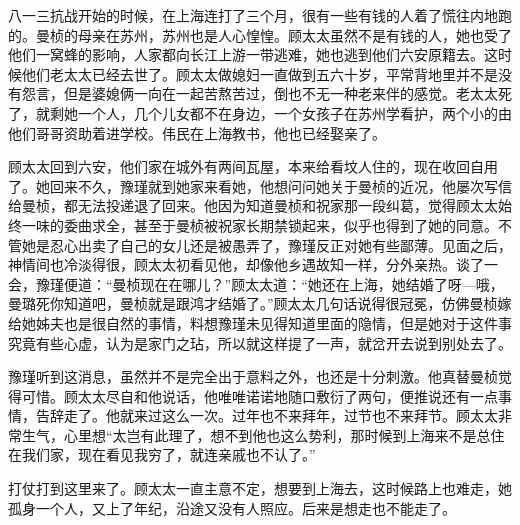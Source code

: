 \par 八一三抗战开始的时候，在上海连打了三个月，很有一些有钱的人着了慌往内地跑的。曼桢的母亲在苏州，苏州也是人心惶惶。顾太太虽然不是有钱的人，她也受了他们一窝蜂的影响，人家都向长江上游一带逃难，她也逃到他们六安原籍去。这时候他们老太太已经去世了。顾太太做媳妇一直做到五六十岁，平常背地里并不是没有怨言，但是婆媳俩一向在一起苦熬苦过，倒也不无一种老来伴的感觉。老太太死了，就剩她一个人，几个儿女都不在身边，一个女孩子在苏州学看护，两个小的由他们哥哥资助着进学校。伟民在上海教书，他也已经娶亲了。
\par 顾太太回到六安，他们家在城外有两间瓦屋，本来给看坟人住的，现在收回自用了。她回来不久，豫瑾就到她家来看她，他想问问她关于曼桢的近况，他屡次写信给曼桢，都无法投递退了回来。他因为知道曼桢和祝家那一段纠葛，觉得顾太太始终一味的委曲求全，甚至于曼桢被祝家长期禁锁起来，似乎也得到了她的同意。不管她是忍心出卖了自己的女儿还是被愚弄了，豫瑾反正对她有些鄙薄。见面之后，神情间也冷淡得很，顾太太初看见他，却像他乡遇故知一样，分外亲热。谈了一会，豫瑾便道：“曼桢现在在哪儿？”顾太太道：“她还在上海，她结婚了呀—哦，曼璐死你知道吧，曼桢就是跟鸿才结婚了。”顾太太几句话说得很冠冕，仿佛曼桢嫁给她姊夫也是很自然的事情，料想豫瑾未见得知道里面的隐情，但是她对于这件事究竟有些心虚，认为是家门之玷，所以就这样提了一声，就岔开去说到别处去了。
\par 豫瑾听到这消息，虽然并不是完全出于意料之外，也还是十分刺激。他真替曼桢觉得可惜。顾太太尽自和他说话，他唯唯诺诺地随口敷衍了两句，便推说还有一点事情，告辞走了。他就来过这么一次。过年也不来拜年，过节也不来拜节。顾太太非常生气，心里想“太岂有此理了，想不到他也这么势利，那时候到上海来不是总住在我们家，现在看见我穷了，就连亲戚也不认了。”
\par 打仗打到这里来了。顾太太一直主意不定，想要到上海去，这时候路上也难走，她孤身一个人，又上了年纪，沿途又没有人照应。后来是想走也不能走了。

